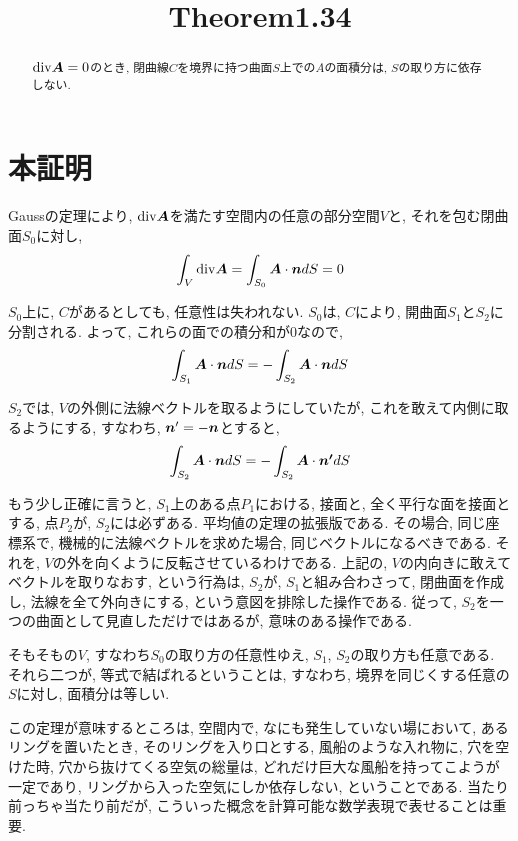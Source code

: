 \documentclass{jsarticle}
\title{Theorem1.34}
\newcommand*{\mbold}[1]{\mbox{\boldmath $#1$}}
\newcommand*{\divg}{{\rm div}}
\begin{document}
\maketitle

\begin{abstract}
  $\divg\mbold{A} = 0$のとき, 閉曲線$C$を境界に持つ曲面$S$上での$A$の面積分は, $S$の取り方に依存しない. 
\end{abstract}

\section{本証明}
Gaussの定理により, $\divg\mbold{A}$を満たす空間内の任意の部分空間$V$と, それを包む閉曲面$S_0$に対し, 
\begin{equation}
  \int_V \divg \mbold{A} = \int_{S_0} \mbold{A}\cdot\mbold{n} dS = 0
\end{equation}

$S_0$上に, $C$があるとしても, 任意性は失われない. 
$S_0$は, $C$により, 開曲面$S_1$と$S_2$に分割される. 
よって, これらの面での積分和が$0$なので, 
\begin{equation}
  \int_{S_1} \mbold{A} \cdot \mbold{n} dS = -\int_{S_2} \mbold{A}\cdot \mbold{n} dS 
\end{equation}

$S_2$では, $V$の外側に法線ベクトルを取るようにしていたが, これを敢えて内側に取るようにする, すなわち, $\mbold{n}^\prime = -\mbold{n}$とすると, 
\begin{equation}
  \int_{S_2} \mbold{A} \cdot \mbold{n} dS = - \int_{S_2} \mbold{A} \cdot \mbold{n^\prime} dS 
\end{equation}

もう少し正確に言うと, $S_1$上のある点$P_1$における, 接面と, 全く平行な面を接面とする, 点$P_2$が, $S_2$には必ずある. 平均値の定理の拡張版である. その場合, 同じ座標系で, 機械的に法線ベクトルを求めた場合, 同じベクトルになるべきである. 
それを, $V$の外を向くように反転させているわけである. 上記の, $V$の内向きに敢えてベクトルを取りなおす, という行為は, $S_2$が, $S_1$と組み合わさって, 閉曲面を作成し, 法線を全て外向きにする, という意図を排除した操作である. 
従って, $S_2$を一つの曲面として見直しただけではあるが, 意味のある操作である. 

そもそもの$V$, すなわち$S_0$の取り方の任意性ゆえ, $S_1$, $S_2$の取り方も任意である. 
それら二つが, 等式で結ばれるということは, すなわち, 境界を同じくする任意の$S$に対し, 面積分は等しい. 

この定理が意味するところは, 空間内で, なにも発生していない場において, あるリングを置いたとき, そのリングを入り口とする, 風船のような入れ物に, 穴を空けた時, 穴から抜けてくる空気の総量は, どれだけ巨大な風船を持ってこようが一定であり, リングから入った空気にしか依存しない, ということである. 当たり前っちゃ当たり前だが, こういった概念を計算可能な数学表現で表せることは重要. 
\end{document}
